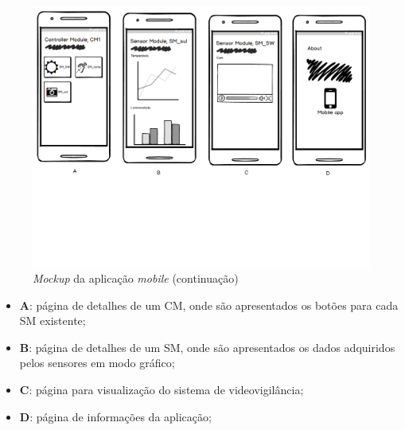 \begin{figure}[h]
	\centering
	\includegraphics[width=\linewidth]{esquemas/mockup/2.pdf}
	\caption{\textit{Mockup} da aplicação \textit{mobile} (continuação)}
	\label{mock2}
\end{figure}

\begin{itemize}
	\item \textbf{A}: página de detalhes de um \acl{CM}, onde são apresentados os botões para cada \acl{SM} existente; 
	\item \textbf{B}: página de detalhes de um \acl{SM}, onde são apresentados os dados adquiridos pelos sensores em modo gráfico; 
	\item \textbf{C}: página para visualização do sistema de videovigilância; 
	\item \textbf{D}: página de informações da aplicação; 
\end{itemize}